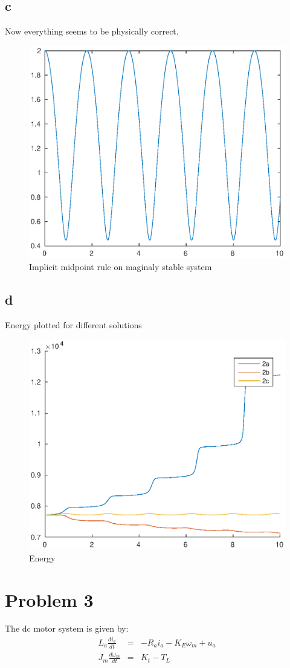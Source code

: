 \documentclass[11pt]{article}
\begin{document}
\subsection*{c}
Now everything seems to be physically correct.
\begin{figure}[H]
\centering
\includegraphics[width=.8\textwidth]{2c.eps}
\caption{Implicit midpoint rule on maginaly stable system}
\end{figure}

\subsection*{d}
Energy plotted for different solutions
\begin{figure}[H]
\centering
\includegraphics[width=.8\textwidth]{2d.eps}
\caption{Energy}
\end{figure}


\section*{Problem 3}
The dc motor system is given by:
\begin{eqnarray*}
L_a \frac{d i_a}{dt} &=& -R_a i_a - K_E \omega_m + u_a \\
J_m \frac{d \omega_m}{dt} &=& K_t - T_L
\end{eqnarray*}
\end{document}
